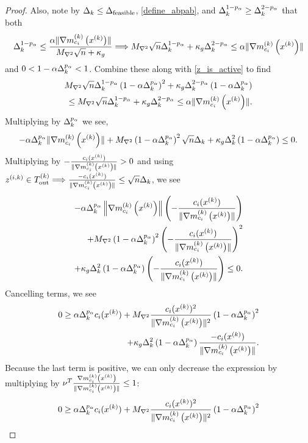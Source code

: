 \begin{proof}
Also, note by $\Delta_k \le {\Delta_{\textrm{feasible}}}$, \cref{define_abpab}, and $\Delta_k^{1 - p_{\alpha}} \ge \Delta_k^{2 - p_{\alpha}}$ that both
\begin{align*}
\Delta_k^{1-p_{\alpha}} \le \frac{\alpha \|{\nabla m_{c_i}^{(k)}\left(x^{(k)}\right)}\|}{{M_{\nabla^2}} \sqrt{n} + \kappa_g} 
\Longrightarrow {M_{\nabla^2}} \sqrt{n}\Delta_k^{1- p_{\alpha}} + \kappa_g \Delta_k^{2 - p_{\alpha}} \le \alpha \|{\nabla m_{c_i}^{(k)}\left(x^{(k)}\right)}\|
\end{align*}
and $0 < 1 - \alpha \Delta_k^{p_{\alpha}} < 1$.
Combine these along with \cref{z_is_active} to find 
\begin{align*}
{M_{\nabla^2}} \sqrt{n}\Delta_k^{1-p_{\alpha}}\left(1 - \alpha \Delta_k^{p_{\alpha}}\right)^2  + \kappa_g \Delta_k^{2 - p_{\alpha}} \left(1 - \alpha \Delta_k^{p_{\alpha}}\right) \\
\le {M_{\nabla^2}} \sqrt{n}\Delta_k^{1 - p_{\alpha}} + \kappa_g \Delta_k^{2 - p_{\alpha}} \le \alpha \|{\nabla m_{c_i}^{(k)}\left(x^{(k)}\right)}\|.
\end{align*}
Multiplying by $\Delta_k^{p_{\alpha}}$ we see,
\begin{align*}
-\alpha \Delta_k^{p_{\alpha}}\|{\nabla m_{c_i}^{(k)}\left(x^{(k)}\right)}\| + {M_{\nabla^2}} \left(1 - \alpha \Delta_k^{p_{\alpha}}\right)^2 \sqrt{n}\Delta_k+ \kappa_g \Delta_k^2 \left(1 - \alpha \Delta_k^{p_{\alpha}}\right) \le  0.
\end{align*}
Multiplying by $-\frac{c_i(x^{(k)})}{\|{\nabla m_{c_i}^{(k)}\left(x^{(k)}\right)}\|} > 0$ and using ${z^{(i, k)}} \in {T_{\text{out}}^{(k)}} \Longrightarrow \frac{-c_i(x^{(k)})}{\|{\nabla m_{c_i}^{(k)}\left(x^{(k)}\right)}\|} \le \sqrt{n}\Delta_k$, we see
\begin{align*}
-\alpha \Delta_k^{p_{\alpha}}\left\|{\nabla m_{c_i}^{(k)}\left(x^{(k)}\right)}\right\|\left(-\frac{c_i(x^{(k)})}{\|{\nabla m_{c_i}^{(k)}\left(x^{(k)}\right)}\|}\right)  \\
+ {M_{\nabla^2}} \left(1 - \alpha \Delta_k^{p_{\alpha}}\right)^2 \left(-\frac{c_i(x^{(k)})}{\|{\nabla m_{c_i}^{(k)}\left(x^{(k)}\right)}\|}\right)^2 \\
+\kappa_g \Delta_k^2 \left(1 - \alpha \Delta_k^{p_{\alpha}}\right)\left(-\frac{c_i(x^{(k)})}{\|{\nabla m_{c_i}^{(k)}\left(x^{(k)}\right)}\|}\right) \le 0.
\end{align*}
Cancelling terms, we see
\begin{align*}
0 
\ge \alpha \Delta_k^{p_{\alpha}} c_i(x^{(k)}) 
+ {M_{\nabla^2}} \frac {c_i(x^{(k)})^2}{\|{\nabla m_{c_i}^{(k)}\left(x^{(k)}\right)}\|^2}\left(1 - \alpha \Delta_k^{p_{\alpha}}\right)^2 \\
+ \kappa_g \Delta_k^2 \left(1 - \alpha \Delta_k^{p_{\alpha}}\right)\frac{-c_i(x^{(k)})}{\|{\nabla m_{c_i}^{(k)}\left(x^{(k)}\right)}\|}.
\end{align*}
Because the last term is positive, we can only decrease the expression by multiplying by $\nu^T \frac{{\nabla m_{c_i}^{(k)}\left(x^{(k)}\right)}}{\|{\nabla m_{c_i}^{(k)}\left(x^{(k)}\right)}\|} \le 1$:
\begin{align*}
0\ge \alpha \dk^{p_{\alpha}} c_i(\xk) + \maxhessian \frac {c_i(\xk)^2}{\|\gmcik\|^2}\left(1 - \alpha \dk^{p_{\alpha}}\right)^2  \\

\end{align*}
\end{proof}
